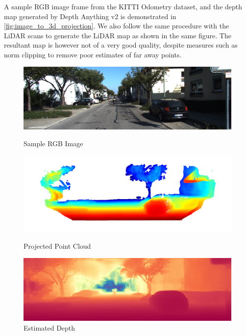 A sample RGB image frame from the KITTI Odometry dataset, and the depth map generated by Depth Anything v2 is demonstrated in \ref{fig:image_to_3d_projection}. We also follow the same procedure with the LiDAR scans to generate the LiDAR map as shown in the same figure. The resultant map is however not of a very good quality, despite measures such as norm clipping to remove poor estimates of far away points.

\begin{figure}[t]
    \centering
    \begin{minipage}{0.49\textwidth}
        \centering
        \includegraphics[width=\textwidth]{figures/rgb_image.png}
        \caption{Sample RGB Image}
        \label{fig:rgb_image}
        \vspace{1em}
        \includegraphics[width=\textwidth]{figures/projected_point_cloud.png}
        \caption{Projected Point Cloud}
        \label{fig:projected_point_cloud}
    \end{minipage}
    \hfill
    \begin{minipage}{0.49\textwidth}
        \centering
        \includegraphics[width=\textwidth]{figures/depth_estimate.png}
        \caption{Estimated Depth}
        \label{fig:depth_estimate}

\end{minipage}
\end{figure}
